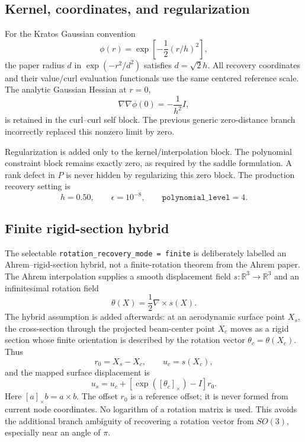 \documentclass[11pt,a4paper]{article}
\newcommand{\RR}{\mathbb{R}}
\newcommand{\curl}{\nabla\times}
\begin{document}
\subsection{Kernel, coordinates, and regularization}

For the Kratos Gaussian convention
\[
  \phi(r)=\exp\!\left[-\frac12(r/h)^2\right],
\]
the paper radius \(d\) in \(\exp(-r^2/d^2)\) satisfies \(d=\sqrt{2}h\).
All recovery coordinates and their value/curl evaluation functionals use the
same centered reference scale.  The analytic Gaussian Hessian at \(r=0\),
\[
  \nabla\nabla\phi(0)=-\frac1{h^2}I,
\]
is retained in the curl--curl self block.  The previous generic zero-distance
branch incorrectly replaced this nonzero limit by zero.

Regularization is added only to the kernel/interpolation block.  The
polynomial constraint block remains exactly zero, as required by the saddle
formulation.  A rank defect in \(P\) is never hidden by regularizing this zero
block.  The production recovery setting is
\[
  h=0.50,\qquad \epsilon=10^{-8},\qquad
  \texttt{polynomial\_level}=4.
\]

\subsection{Finite rigid-section hybrid}

The selectable \texttt{rotation\_recovery\_mode = finite} is deliberately
labelled an Ahrem--rigid-section hybrid, not a finite-rotation theorem from
the Ahrem paper.  The Ahrem interpolation supplies a smooth displacement
field \(s:\RR^3\to\RR^3\) and an infinitesimal rotation field
\[
  \theta(X)=\frac12\curl s(X).
\]
The hybrid assumption is added afterwards: at an aerodynamic surface point
\(X_s\), the cross-section through the projected beam-center point \(X_c\)
moves as a rigid section whose finite orientation is described by the
rotation vector \(\theta_c=\theta(X_c)\).  Thus
\[
  r_0 = X_s-X_c,
  \qquad
  u_c=s(X_c),
\]
and the mapped surface displacement is
\begin{equation}
  u_s
  =
  u_c+\left[\exp([\theta_c]_\times)-I\right]r_0 .
  \label{eq:finite_hybrid_forward}
\end{equation}
Here \([a]_\times b=a\times b\).  The offset \(r_0\) is a reference offset; it
is never formed from current node coordinates.  No logarithm of a rotation
matrix is used.  This avoids the additional branch ambiguity of recovering a
rotation vector from \(SO(3)\), especially near an angle of \(\pi\).
\end{document}
